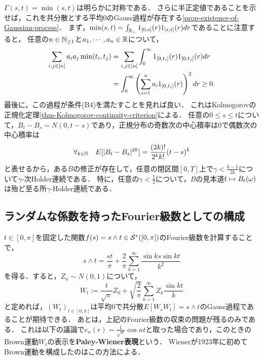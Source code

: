 \documentclass[uplatex,dvipdfmx]{jsreport}
\begin{document}
\begin{construction}\label{construction-Kolmogorov}
    $\Gamma(s,t)=\min(s,t)$は明らかに対称である．
    さらに半正定値であることを示せば，これを共分散とする平均$0$のGauss過程が存在する\ref{prop-existence-of-Gaussian-process}．
    まず，$\min(s,t)=\int_{\mathbb{R}_+}1_{[0,s]}(r)1_{[s,t]}(r)dr$であることに注意すると，
    任意の$n\in\mathbb{N}_{\ge1}$と$a_1,\cdots,a_n\in\mathbb{R}$について，
    \begin{align*}
        \sum_{i,j\in[n]}a_ia_j\min(t_i,t_j)&=\sum_{i,j\in[n]}\int^\infty_01_{[0,t_i]}(r)1_{[0,t_j]}(r)dr\\
        &=\int^\infty_0\left(\sum_{i=1}^na_i1_{[0,t_i]}(r)\right)^2dr\ge0.
    \end{align*}
    最後に，この過程が条件(B4)を満たすことを見れば良い．
    これはKolmogorovの正規化定理\ref{thm-Kolmogorov-continuity-criterion}による．
    任意の$0\le s\le  t$について，$B_t-B_s\sim N(0,t-s)$であり，正規分布の奇数次の中心積率は$0$で偶数次の中心積率は
    \[\forall_{k\in\mathbb{N}}\quad E[\lvert B_t-B_s\rvert^{2k}]=\frac{(2k)!}{2^kk!}(t-s)^k\]
    と表せるから，ある$B$の修正が存在して，任意の閉区間$[0,T]$上で$\gamma<\frac{k-1}{2k}$について$\gamma$-次Holder連続である．
    特に，任意の$\gamma<\frac{1}{2}$について，$B$の見本道$t\mapsto B_t(\omega)$は殆ど至る所$\gamma$-Holder連続である．
\end{construction}

\subsection{ランダムな係数を持ったFourier級数としての構成}

\begin{tcolorbox}[colframe=ForestGreen, colback=ForestGreen!10!white,breakable,colbacktitle=ForestGreen!40!white,coltitle=black,fonttitle=\bfseries\sffamily,
title=]
    $t\in[0,\pi]$を固定した関数$f(s)=s\land t\in\mathcal{S}^*([0,\pi])$のFourier級数を計算することで，
    \[s\land t=\frac{st}{\pi}+\frac{2}{\pi}\sum^\infty_{k=1}\frac{\sin ks\sin kt}{k^2}\]
    を得る．すると，$Z_n\sim N(0,1)$について，
    \[W_t:=\frac{t}{\sqrt{\pi}}Z_0+\sqrt{\frac{2}{\pi}}\sum^\infty_{k=1}Z_k\frac{\sin kt}{k}\]
    と定めれば，$(W_t)_{t\in[0,\pi]}$は平均$0$で共分散$E[W_sW_t]=s\land t$のGauss過程であることが期待できる．
    あとは，上記のFourier級数の収束の問題が残るのみである．
    これは以下の議論で$e_n(r)=\frac{1}{\sqrt{\pi}}\cos nt$と取った場合であり，このときのBrown運動$W_t$の表示を\textbf{Paley-Wiener表現}という．
    Wienerが1923年に初めてBrown運動を構成したのはこの方法による．
\end{tcolorbox}
\end{document}
